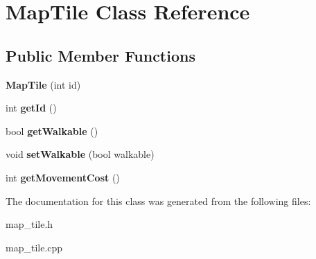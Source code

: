 \hypertarget{class_map_tile}{}\section{Map\+Tile Class Reference}
\label{class_map_tile}
\subsection*{Public Member Functions}
\begin{DoxyCompactItemize}
\item 
\hypertarget{class_map_tile_a983d82363db202e5902fffe3c29c0a83}{}{\bfseries Map\+Tile} (int id)\label{class_map_tile_a983d82363db202e5902fffe3c29c0a83}

\item 
\hypertarget{class_map_tile_a9246c75eea35529c0a3ef88bb4536225}{}int {\bfseries get\+Id} ()\label{class_map_tile_a9246c75eea35529c0a3ef88bb4536225}

\item 
\hypertarget{class_map_tile_aa79a23c47ce28d247e1e97ed3a855101}{}bool {\bfseries get\+Walkable} ()\label{class_map_tile_aa79a23c47ce28d247e1e97ed3a855101}

\item 
\hypertarget{class_map_tile_a459e9254decb2500df2539ef7948689b}{}void {\bfseries set\+Walkable} (bool walkable)\label{class_map_tile_a459e9254decb2500df2539ef7948689b}

\item 
\hypertarget{class_map_tile_a06d963e18836fc0a6bce6fb55f487582}{}int {\bfseries get\+Movement\+Cost} ()\label{class_map_tile_a06d963e18836fc0a6bce6fb55f487582}

\end{DoxyCompactItemize}


The documentation for this class was generated from the following files\+:\begin{DoxyCompactItemize}
\item 
map\+\_\+tile.\+h\item 
map\+\_\+tile.\+cpp\end{DoxyCompactItemize}

